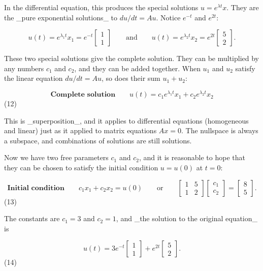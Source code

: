 In the differential equation, this produces the special solutions \(u=e^{\lambda t}x\). They are the _pure exponential solutions_ to \(du/dt=Au\). Notice \(e^{-t}\) and \(e^{2t}\):

\[u(t)=e^{\lambda_{1}t}x_{1}=e^{-t}\begin{bmatrix}1\\ 1\end{bmatrix}\qquad\text{and}\qquad u(t)=e^{\lambda_{2}t}x_{2}=e^{2t} \begin{bmatrix}5\\ 2\end{bmatrix}.\]

These two special solutions give the complete solution. They can be multiplied by any numbers \(c_{1}\) and \(c_{2}\), and they can be added together. When \(u_{1}\) and \(u_{2}\) satisfy the linear equation \(du/dt=Au\), so does their sum \(u_{1}+u_{2}\):

\[\textbf{Complete solution}\qquad u(t)=c_{1}e^{\lambda_{1}t}x_{1}+c_{2}e^{ \lambda_{2}t}x_{2}\] (12)

This is _superposition_, and it applies to differential equations (homogeneous and linear) just as it applied to matrix equations \(Ax=0\). The nullspace is always a subspace, and combinations of solutions are still solutions.

Now we have two free parameters \(c_{1}\) and \(c_{2}\), and it is reasonable to hope that they can be chosen to satisfy the initial condition \(u=u(0)\) at \(t=0\):

\[\textbf{Initial condition}\qquad c_{1}x_{1}+c_{2}x_{2}=u(0)\qquad\text{or} \qquad\begin{bmatrix}1&5\\ 1&2\end{bmatrix}\begin{bmatrix}c_{1}\\ c_{2}\end{bmatrix}=\begin{bmatrix}8\\ 5\end{bmatrix}.\] (13)

The constants are \(c_{1}=3\) and \(c_{2}=1\), and _the solution to the original equation_ is

\[u(t)=3e^{-t}\begin{bmatrix}1\\ 1\end{bmatrix}+e^{2t}\begin{bmatrix}5\\ 2\end{bmatrix}.\] (14)

